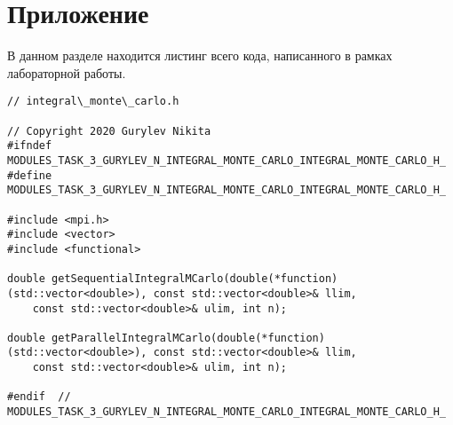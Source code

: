 \documentclass{report}
\begin{document}
\section*{Приложение}
В данном разделе находится листинг всего кода, написанного в рамках лабораторной работы.
\begin{lstlisting}
// integral\_monte\_carlo.h

// Copyright 2020 Gurylev Nikita
#ifndef MODULES_TASK_3_GURYLEV_N_INTEGRAL_MONTE_CARLO_INTEGRAL_MONTE_CARLO_H_
#define MODULES_TASK_3_GURYLEV_N_INTEGRAL_MONTE_CARLO_INTEGRAL_MONTE_CARLO_H_

#include <mpi.h>
#include <vector>
#include <functional>

double getSequentialIntegralMCarlo(double(*function)(std::vector<double>), const std::vector<double>& llim,
    const std::vector<double>& ulim, int n);

double getParallelIntegralMCarlo(double(*function)(std::vector<double>), const std::vector<double>& llim,
    const std::vector<double>& ulim, int n);

#endif  // MODULES_TASK_3_GURYLEV_N_INTEGRAL_MONTE_CARLO_INTEGRAL_MONTE_CARLO_H_

\end{lstlisting}
\end{document}
